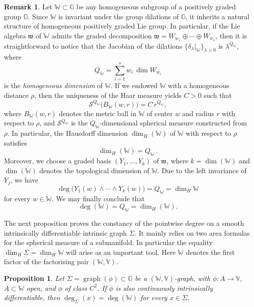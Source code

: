 \documentclass[dvipsnames]{amsart}
\newtheorem{proposition}[theorem]{Proposition}
\theoremstyle{definition}
\newtheorem{remark}[theorem]{Remark}
\theoremstyle{definition}
\numberwithin{equation}{section}
\newcommand{\W}{\mathbb{W}}
\newcommand{\V}{\mathbb{V}}
\newcommand{\G}{\mathbb{G}}
\begin{document}
\begin{remark}
Let $\W\subset \mathbb G$ be any homogeneous subgroup of a positively graded group $\mathbb G$. Since $\W$ is invariant under the group dilations of $\mathbb G$, it inherits a natural structure of homogeneous positively graded Lie group. In particular, if the Lie algebra $\mathfrak w$ of $\W$ admits the graded decomposition $\mathfrak w = W_{w_1} \oplus \cdots \oplus W_{w_s}$, then it is straightforward to notice that the Jacobian of the dilations $\{\delta_\lambda|_\W\}_{\lambda>0}$ is $\lambda^{Q_\W}$, where 
\[
Q_\W= \sum_{i=1}^s w_i\, \dim W_{w_i}
\]
is the {\em homogeneous dimension} of $\W$. 
If we endowed $\W$ with a homogeneous distance $\rho$, then the uniqueness of the Haar measure yields $C>0$ such that
\[
\mathcal{S}^{Q_\W}\big(B_\W(w,r)\big)= C\, r^{Q_\W},
\]
where $B_\W(w,r)$ denotes the metric ball in $\W$ of center $w$ and radius $r$ with respect to $\rho$, 
and $\mathcal S^{Q_\W}$ is the $Q_\W$-dimensional spherical measure constructed from $\rho$. 
In particular, the Hausdorff dimension $\operatorname{dim}_H(\W)$ of $\W$ with respect to $\rho$ satisfies
\[
\dim_H(\W) = Q_\W\,.
\]
Moreover, we choose a graded basis $(Y_1,\ldots,Y_k)$ of $\mathfrak w$, where 
$k=\operatorname{dim}(\W)$ and $\operatorname{dim}(\W)$ denotes the topological dimension of $\W$. Due to the left invariance of $Y_j$, we have
\[
\deg\big(Y_1(w)\wedge \cdots \wedge Y_k(w)\big)=Q_\W=\dim_H\W
\]
for every $w\in\W$. We may finally conclude that 
\[
\deg(\W)=Q_\W=\dim_H(\W).
\]
\end{remark}
The next proposition proves the constancy of the pointwise degree on a smooth intrinsically differentiable intrinsic graph $\Sigma$. It mainly relies on two area formulas for the spherical measure of a submanifold. In particular the equality $\dim_H\Sigma=\dim_H\W$ will arise as an important tool. Here $\W$ denotes the first factor of the factorising pair $(\W,\V)$.
\begin{proposition}\label{prop: smooth intrinsic graphs constant degree}
Let $\Sigma=\operatorname{graph}(\phi)\subset\G$ be a $(\W,\V)$-graph, with $\phi\colon A\to\V$, $A\subset\W$ open, and $\phi$ of class $C^2$. If $\phi$ is also continuously intrinsically differentiable, then $\operatorname{deg}_\Sigma(x)=\deg(\W)$ for every $x\in\Sigma$.
\end{proposition}
\end{document}
